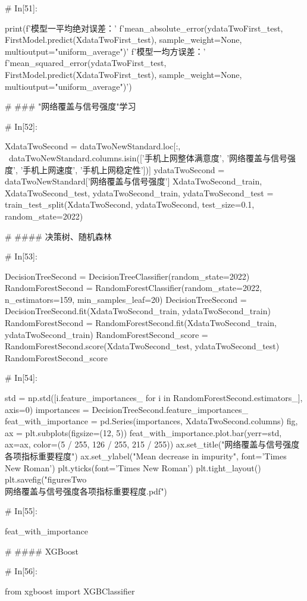 \documentclass{MathorCupmodeling}
\begin{document}
\begin{python}
	# In[51]:
	
	
	print(f'模型一平均绝对误差：'
		  f'{mean_absolute_error(ydataTwoFirst_test, FirstModel.predict(XdataTwoFirst_test), sample_weight=None, multioutput="uniform_average")}\n'
		  f'模型一均方误差：'
		  f'{mean_squared_error(ydataTwoFirst_test, FirstModel.predict(XdataTwoFirst_test), sample_weight=None, multioutput="uniform_average")}')
	
	# ### "网络覆盖与信号强度"学习
	
	# In[52]:
	
	
	XdataTwoSecond = dataTwoNewStandard.loc[:, ~dataTwoNewStandard.columns.isin(['手机上网整体满意度', '网络覆盖与信号强度', '手机上网速度', '手机上网稳定性'])]
	ydataTwoSecond = dataTwoNewStandard['网络覆盖与信号强度']
	XdataTwoSecond_train, XdataTwoSecond_test, ydataTwoSecond_train, ydataTwoSecond_test = train_test_split(XdataTwoSecond, ydataTwoSecond, test_size=0.1, random_state=2022)
	
	# #### 决策树、随机森林
	
	# In[53]:
	
	
	DecisionTreeSecond = DecisionTreeClassifier(random_state=2022)
	RandomForestSecond = RandomForestClassifier(random_state=2022, n_estimators=159, min_samples_leaf=20)
	DecisionTreeSecond = DecisionTreeSecond.fit(XdataTwoSecond_train, ydataTwoSecond_train)
	RandomForestSecond = RandomForestSecond.fit(XdataTwoSecond_train, ydataTwoSecond_train)
	RandomForestSecond_score = RandomForestSecond.score(XdataTwoSecond_test, ydataTwoSecond_test)
	RandomForestSecond_score
	
	# In[54]:
	
	
	std = np.std([i.feature_importances_ for i in RandomForestSecond.estimators_], axis=0)
	importances = DecisionTreeSecond.feature_importances_
	feat_with_importance = pd.Series(importances, XdataTwoSecond.columns)
	fig, ax = plt.subplots(figsize=(12, 5))
	feat_with_importance.plot.bar(yerr=std, ax=ax, color=(5 / 255, 126 / 255, 215 / 255))
	ax.set_title("网络覆盖与信号强度各项指标重要程度")
	ax.set_ylabel("Mean decrease in impurity", font='Times New Roman')
	plt.yticks(font='Times New Roman')
	plt.tight_layout()
	plt.savefig("figuresTwo\\[附件2]网络覆盖与信号强度各项指标重要程度.pdf")
	
	# In[55]:
	
	
	feat_with_importance
	
	# #### XGBoost
	
	# In[56]:
	
	
	from xgboost import XGBClassifier
	

\end{python}
\end{document}
